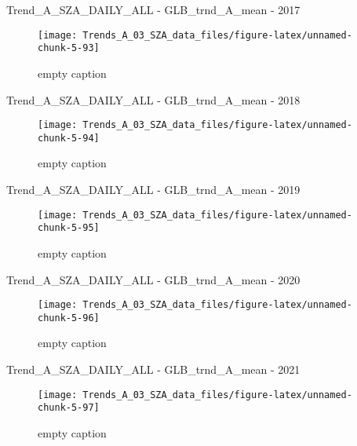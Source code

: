 \documentclass[
  10pt,
  a4paper,oneside]{article}
\begin{document}
Trend\_A\_SZA\_DAILY\_ALL - GLB\_trnd\_A\_mean - 2017

\begin{figure}[!ht]

{\centering \texttt{[image: Trends\_A\_03\_SZA\_data\_files/figure-latex/unnamed-chunk-5-93]} 

}

\caption{ empty caption }\label{fig:unnamed-chunk-5-93}
\end{figure}

Trend\_A\_SZA\_DAILY\_ALL - GLB\_trnd\_A\_mean - 2018

\begin{figure}[!ht]

{\centering \texttt{[image: Trends\_A\_03\_SZA\_data\_files/figure-latex/unnamed-chunk-5-94]} 

}

\caption{ empty caption }\label{fig:unnamed-chunk-5-94}
\end{figure}

Trend\_A\_SZA\_DAILY\_ALL - GLB\_trnd\_A\_mean - 2019

\begin{figure}[!ht]

{\centering \texttt{[image: Trends\_A\_03\_SZA\_data\_files/figure-latex/unnamed-chunk-5-95]} 

}

\caption{ empty caption }\label{fig:unnamed-chunk-5-95}
\end{figure}

Trend\_A\_SZA\_DAILY\_ALL - GLB\_trnd\_A\_mean - 2020

\begin{figure}[!ht]

{\centering \texttt{[image: Trends\_A\_03\_SZA\_data\_files/figure-latex/unnamed-chunk-5-96]} 

}

\caption{ empty caption }\label{fig:unnamed-chunk-5-96}
\end{figure}

Trend\_A\_SZA\_DAILY\_ALL - GLB\_trnd\_A\_mean - 2021

\begin{figure}[!ht]

{\centering \texttt{[image: Trends\_A\_03\_SZA\_data\_files/figure-latex/unnamed-chunk-5-97]} 

}

\caption{ empty caption }\label{fig:unnamed-chunk-5-97}
\end{figure}
\end{document}
